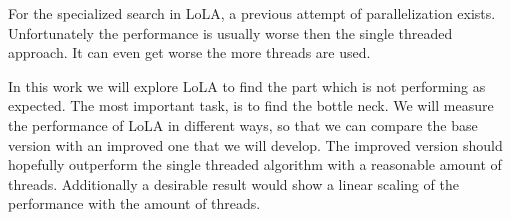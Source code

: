 For the specialized search in LoLA, a previous attempt of parallelization exists. Unfortunately the performance is usually worse then the single threaded approach. It can even get worse the more threads are used.

In this work we will explore LoLA to find the part which is not performing as expected. The most important task, is to find the bottle neck. We will measure the performance of LoLA in different ways, so that we can compare the base version with an improved one that we will develop. The improved version should hopefully outperform the single threaded algorithm with a reasonable amount of threads. Additionally a desirable result would show a linear scaling of the performance with the amount of threads.



